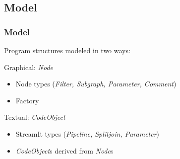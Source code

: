 \documentclass{beamer}
\begin{document}
\subsection{Model}
\begin{frame}
\frametitle{Model}
Program structures modeled in two ways:
\begin{block}{Graphical: \textit{Node}}
	\begin{itemize}
		\item Node types (\textit{Filter, Subgraph, Parameter, Comment})
		\item Factory
	\end{itemize}
\end{block}
\begin{block}{Textual: \textit{CodeObject}}
	\begin{itemize}
		\item StreamIt types (\textit{Pipeline, Splitjoin, Parameter})
		\item \textit{CodeObject}s derived from \textit{Node}s
	\end{itemize}
\end{block}
\end{frame}
\end{document}
